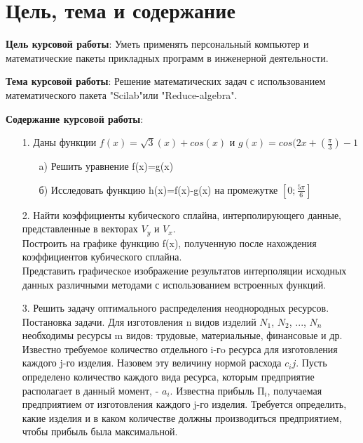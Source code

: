 \documentclass[russian,utf8,nocolumnxxxi,nocolumnxxxii]{eskdtext}
\begin{document}
\maketitle

\newpage
\tableofcontents

\newpage
\section{Цель, тема и содержание}
\textbf{Цель курсовой работы}: Уметь применять персональный компьютер и математические пакеты прикладных программ в инженерной деятельности.

\textbf{Тема курсовой работы}: Решение математических задач с использованием математического пакета
"Scilab"или "Reduce-algebra".

\textbf{Содержание курсовой работы}:
\begin{enumerate}
    \item[1.] Даны функции $f(x)=\sqrt{3}(x)+cos(x)$ и $g(x)=cos(2x+(\frac{\pi}{3})-1$
\begin{enumerate}
    \item[a)] Решить уравнение f(x)=g(x)
    \item[б)] Исследовать функцию h(x)=f(x)-g(x) на промежутке $[0;\frac{5\pi}{6}]$
\end{enumerate}
    \item[2.] Найти коэффициенты кубического сплайна, интерполирующего данные, представленные в векторах $V_y$ и $V_x$.
    \\Построить на графике функцию f(x), полученную после нахождения коэффициентов кубического сплайна.
    \\Представить графическое изображение результатов интерполяции исходных данных различными методами с использованием встроенных функций.
    \item[3.]Решить задачу оптимального распределения неоднородных ресурсов. Постановка задачи. Для изготовления n видов изделий $N_1$, $N_2$, ..., $N_n$ необходимы ресурсы m видов: трудовые, материальные, финансовые и др. Известно требуемое количество отдельного i-гo ресурса для изготовления каждого j-го изделия. Назовем эту величину нормой расхода  $c_ij$. Пусть определено количество каждого вида ресурса, которым предприятие располагает в данный момент, - $a_i$. Известна прибыль $П_i$, получаемая предприятием от изготовления каждого j-го изделия. Требуется определить, какие изделия и в каком количестве должны производиться предприятием, чтобы прибыль была максимальной.
\end{enumerate}
\end{document}
